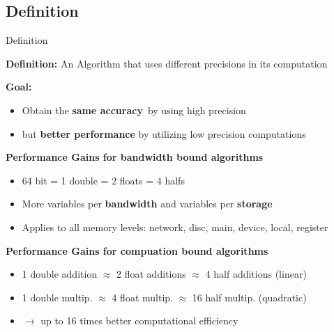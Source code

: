 \documentclass[10pt]{beamer}
\begin{document}
\subsection{Definition}
\begin{frame}{Definition}
\begin{block}{\textbf{Definition:}}
An Algorithm that 
uses different precisions in its computation
\end{block}

\textbf{Goal: } 
\begin{itemize}
\item[] Obtain the \textbf{same accuracy}~by using 
high precision
\item[] but \textbf{better performance}
by utilizing low precision computations
\end{itemize}
\textbf{Performance Gains for bandwidth bound algorithms}~\\
 \begin{itemize}
  \item 64 bit = 1 double = 2 floats = 4 halfs
  \item More variables per \textbf{bandwidth} and variables per \textbf{storage}
  \item Applies to all memory levels: network, disc, main, device, local, register 
 \end{itemize}
\textbf{Performance Gains for compuation bound algorithms}~\\
 \begin{itemize}
  \item 1 double addition $\approx$ 2 float additions $\approx$ 4 half additions (linear)
  \item 1 double multip. $\approx$ 4 float multip. $\approx$ 16 half multip. (quadratic)
  \item $\rightarrow$ up to 16 times better computational efficiency
 \end{itemize}

\end{frame}
\end{document}
